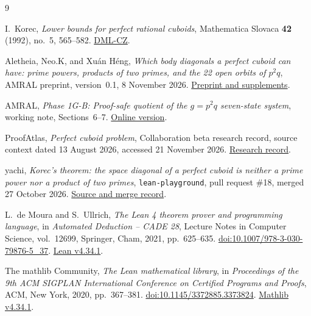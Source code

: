 \documentclass[11pt,a4paper,twoside]{article}
\numberwithin{equation}{section}
\begin{document}
\begin{thebibliography}{9}
\raggedright
{}
I.~Korec, \emph{Lower bounds for perfect rational cuboids},
Mathematica Slovaca \textbf{42} (1992), no.~5, 565--582.
\href{https://dml.cz/handle/10338.dmlcz/132903}{DML-CZ}.

Aletheia, Neo.K, and Xuán Héng, \emph{Which body diagonals a perfect cuboid can have: prime powers, products of two primes, and the 22 open orbits of \(p^2q\)},
AMRAL preprint, version~0.1, 8 November 2026.
\href{https://amral.evemisslab.com/en/perfect-cuboid/papers/body-diagonal-factorization/}{Preprint and supplements}.

AMRAL, \emph{Phase 1G-B: Proof-safe quotient of the \(g=p^2q\) seven-state system},
working note, Sections~6--7.
\href{https://amral.evemisslab.com/en/perfect-cuboid/files/phase1g_b_p2q_four_class_reduction.md}{Online version}.

ProofAtlas, \emph{Perfect cuboid problem},
Collaboration beta research record, source context dated 13 August 2026, accessed 21 November 2026.
\href{https://www.proofatlas.ai/collaboration/perfect-cuboid-problem/}{Research record}.

yachi, \emph{Korec's theorem: the space diagonal of a perfect cuboid is neither a prime power nor a product of two primes},
\texttt{lean-playground}, pull request \#18, merged 27 October 2026.
\href{https://github.com/yachi/lean-playground/pull/18}{Source and merge record}.

L.~de Moura and S.~Ullrich, \emph{The Lean 4 theorem prover and programming language},
in \emph{Automated Deduction -- CADE 28}, Lecture Notes in Computer Science, vol.~12699, Springer, Cham, 2021, pp.~625--635.
\href{https://doi.org/10.1007/978-3-030-79876-5_37}{doi:10.1007/978-3-030-79876-5\_37}.
\href{https://github.com/leanprover/lean4/releases/tag/v4.34.1}{Lean v4.34.1}.

The mathlib Community, \emph{The Lean mathematical library},
in \emph{Proceedings of the 9th ACM SIGPLAN International Conference on Certified Programs and Proofs}, ACM, New York, 2020, pp.~367--381.
\href{https://doi.org/10.1145/3372885.3373824}{doi:10.1145/3372885.3373824}.
\href{https://github.com/leanprover-community/mathlib4/releases/tag/v4.34.1}{Mathlib v4.34.1}.
\end{thebibliography}
\end{document}
